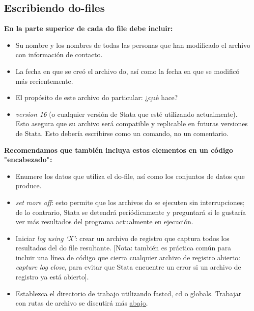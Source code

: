 \documentclass[11pt,en]{elegantpaper}
\begin{document}
\subsection{Escribiendo do-files}
\label{sec:dofiles}

\noindent
\textbf{En la parte superior de cada do file debe incluir:}

\begin{itemize}
	\item Su nombre y los nombres de todas las personas que han modificado el archivo con información de contacto.
	
	\item La fecha en que se creó el archivo do, así como la fecha en que se modificó más recientemente.
	
	\item El propósito de este archivo do particular: ¿qué hace?
	
	\item \textit{version 16} (o cualquier versión de Stata que esté utilizando actualmente). Esto asegura que su archivo será compatible y replicable en futuras versiones de Stata. Esto debería escribirse como un comando, no un comentario. 
\end{itemize}

\noindent
\textbf{Recomendamos que también incluya estos elementos en un código "encabezado":}

\begin{itemize}
	\item Enumere los datos que utiliza el do-file, así como los conjuntos de datos que produce.
	
	\item \textit{set more off}: esto permite que los archivos do se ejecuten sin interrupciones; de lo contrario, Stata se detendrá periódicamente y preguntará si le gustaría ver más resultados del programa actualmente en ejecución.
	
	\item Iniciar \textit{log using `X'}: crear un archivo de registro que captura todos los resultados del do file resultante. [Nota: también es práctica común para incluir una línea de código que cierra cualquier archivo de registro abierto: \textit{capture log close}, para evitar que Stata encuentre un error si un archivo de registro ya está abierto].
	
	\item Establezca el directorio de trabajo utilizando fastcd, cd o globals. Trabajar con rutas de archivo se discutirá más
    \hyperref[sec:refrelativas]{abajo}.  
\end{itemize}
\end{document}
